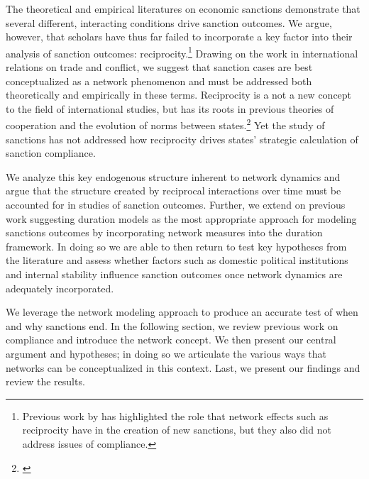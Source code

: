 The theoretical and empirical literatures on economic sanctions demonstrate that several different, interacting conditions drive sanction outcomes. We argue, however, that scholars have thus far failed to incorporate a key factor into their analysis of sanction outcomes: reciprocity.\footnote{Previous work by \cite{cranmer2014reciprocity} has highlighted the role that network effects such as reciprocity have in the creation of new sanctions, but they also did not address issues of compliance.} Drawing on the work in international relations on trade and conflict, we suggest that sanction cases are best conceptualized as a network phenomenon and must be addressed both theoretically and empirically in these terms. Reciprocity is a not a new concept to the field of international studies, but has its roots in previous theories of cooperation and the evolution of norms between states.\footnote{\cite{richardsonai:1960,choucri:north:1972,goldstein1991reciprocity,rajmaira1990evolving,ward1992reciprocity}} Yet the study of sanctions has not addressed how reciprocity drives  states' strategic calculation of sanction compliance. 

We analyze this key endogenous structure inherent to network dynamics and argue that the structure created by reciprocal interactions over time must be accounted for in studies of sanction outcomes. Further, we extend on previous work suggesting duration models as the most appropriate approach for modeling sanctions outcomes by incorporating network measures into the duration framework. In doing so we are able to then return to test key hypotheses from the literature and assess whether factors such as domestic political institutions and internal stability influence sanction outcomes once network dynamics are adequately incorporated.  

We leverage the network modeling approach to produce an accurate test of when and why sanctions end. In the following section, we review previous work on compliance and introduce the network concept. We then present our central argument and hypotheses; in doing so we articulate the various ways that networks can be conceptualized in this context. Last, we present our findings and review the results.